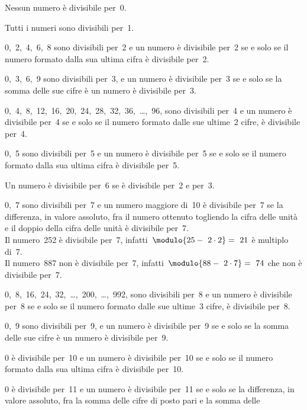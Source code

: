 \begin{description} [noitemsep]
\item[\textbf{0}:~] Nessun numero è divisibile per~0.
\item[\textbf{1}:~] Tutti i numeri sono divisibili per~1.
\item[\textbf{2}:~] 0,~2,~4,~6,~8 sono divisibili per~2 
e un numero è divisibile per~2 se e solo se il numero formato dalla sua 
ultima cifra è divisibile per~2.
\item[\textbf{3}:~] 0,~3,~6,~9 sono divisibili per~3,
e un numero è divisibile per~3 se e solo se la somma delle sue cifre è un 
numero è divisibile per~3.
\item[\textbf{4}:~] 0,~4,~8,~12,~16,~20,~24,~28,~32,~36,~\dots,~96,
sono divisibili per~4 
e un numero è divisibile per~4 se e solo se il numero formato dalle sue 
ultime~2 cifre, è divisibile per~4.
\item[\textbf{5}:~] 0,~5 sono divisibili per~5 
e un numero è divisibile per~5 se e solo se il numero formato dalla sua 
ultima cifra è divisibile per~5.
\item[\textbf{6}:~] Un numero è divisibile per~6 se è divisibile 
per~2 e per~3.
\item[\textbf{7}:~] 0,~7 sono divisibili per~7 
e un numero maggiore di~10 è divisibile per~7 se la differenza, 
in valore assoluto, fra il numero ottenuto togliendo la cifra delle unità 
e il doppio della cifra delle unità è divisibile per~7.\\
Il numero~252 è divisibile per~7, infatti~\( \modulo{25 -~2\cdot 2}=~21\) è 
multiplo di~7.\\
Il numero~887 non è divisibile per~7, infatti~\(\modulo{88 -~2\cdot 7}=~74\) 
che non è divisibile per~7.
\item[\textbf{8}:~] 0,~8,~16,~24,~32,~\dots,~200,~\dots,~992, sono 
divisibili per~8 
e un numero è divisibile per~8 se e solo se il numero formato dalle sue 
ultime~3 cifre, è divisibile per~8.
\item[\textbf{9}:~] 0,~9 sono divisibili per~9,
e un numero è divisibile per~9 se e solo se la somma delle sue cifre è un 
numero è divisibile per~9.
\item[\textbf{10}:~] 0 è divisibile per~10 
e un numero è divisibile per~10 se e solo se il numero formato dalla sua 
ultima cifra è divisibile per~10.
\item[\textbf{11}:~] 0 è divisibile per~11
e un numero è divisibile per~11 se e solo se la differenza, 
in valore assoluto, fra la somma delle cifre di posto pari e la somma delle 

\end{description}
